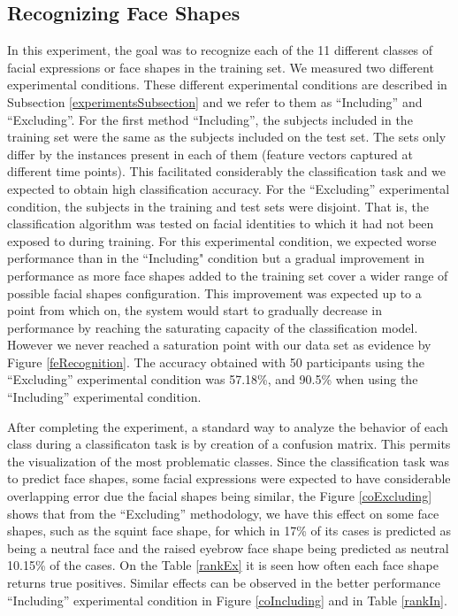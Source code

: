 \documentclass[]{article}
\begin{document}
\subsection{Recognizing Face Shapes}
In this experiment, the goal was to recognize each of the 11 different classes of facial expressions or face shapes in
the training set. We measured two different experimental conditions. These different experimental conditions are
described in Subsection \ref{experimentsSubsection} and we refer to them as ``Including'' and ``Excluding''. For the
first method ``Including'', the subjects included in the training set were the same as the subjects included on the test
set. The sets only differ by the instances present in each of them (feature vectors captured at different time points).
This facilitated considerably the classification task and we expected to obtain high classification accuracy. For the
``Excluding'' experimental condition, the subjects in the training and test sets were disjoint. That is, the
classification algorithm was tested on facial identities to which it had not been exposed to during training. For this
experimental condition, we expected worse performance than in the ``Including" condition but a gradual improvement in
performance as more face shapes added to the training set cover a wider range of possible facial shapes configuration.
This improvement was expected up to a point from which on, the system would start to gradually decrease in performance
by reaching the saturating capacity of the classification model. However we never reached a saturation point with our
data set as evidence by Figure \ref{feRecognition}. The accuracy obtained with 50 participants using the ``Excluding''
experimental condition was 57.18\%, and 90.5\% when using the ``Including'' experimental condition.
 
 
After completing the experiment, a standard way to analyze the behavior of each class during a classificaton task is by
creation of a confusion matrix. This permits the visualization of the most problematic classes. Since the classification
task was to predict face shapes, some facial expressions were expected to have considerable overlapping error due the
facial shapes being similar, the Figure \ref{coExcluding} shows that from the ``Excluding'' methodology, we have this
effect on some face shapes, such as the squint face shape, for which in 17\% of its cases is predicted as being a
neutral face and the raised eyebrow face shape being predicted as neutral 10.15\% of the cases.
On the Table \ref{rankEx} it is seen how often each face shape returns
true positives. Similar effects can be observed in the better performance ``Including'' experimental condition in Figure
\ref{coIncluding} and in Table \ref{rankIn}. 
\end{document}
